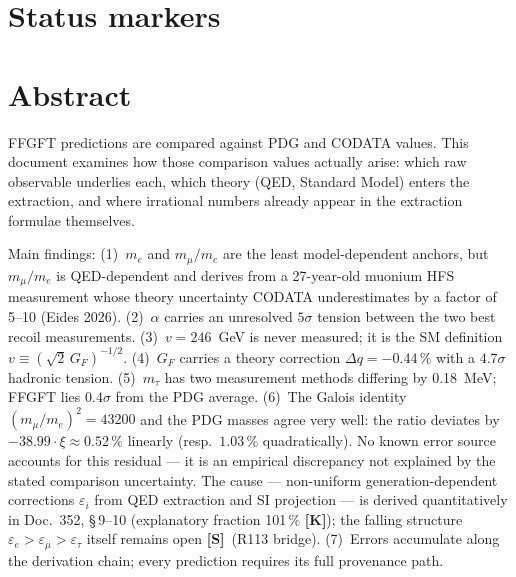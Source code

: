 \providecommand{\BM}{\textbf{[B]}}
\providecommand{\KM}{\textbf{[K]}}
\providecommand{\SM}{\textbf{[S]}}
\providecommand{\QM}{\textbf{[Q]}}

{}

\section*{Status markers}


\section*{Abstract}

FFGFT predictions are compared against PDG and CODATA values. This document examines how those comparison values actually arise: which raw observable underlies each, which theory (QED, Standard Model) enters the extraction, and where irrational numbers already appear in the extraction formulae themselves.

Main findings: (1)~$m_e$ and $m_\mu/m_e$ are the least model-dependent anchors, but $m_\mu/m_e$ is QED-dependent and derives from a 27-year-old muonium HFS measurement whose theory uncertainty CODATA underestimates by a factor of 5--10 (Eides 2026). (2)~$\alpha$ carries an unresolved $5\sigma$ tension between the two best recoil measurements. (3)~$v=246$~GeV is never measured; it is the SM definition $v\equiv(\sqrt2\,G_F)^{-1/2}$. (4)~$G_F$ carries a theory correction $\Delta q=-0.44\,\%$ with a $4.7\sigma$ hadronic tension. (5)~$m_\tau$ has two measurement methods differing by 0.18~MeV; FFGFT lies $0.4\sigma$ from the PDG average. (6)~The Galois identity $(m_\mu/m_e)^2=43200$ and the PDG masses agree very well: the ratio deviates by $-38.99\cdot\xi\approx0.52\,\%$ linearly (resp.\ $1.03\,\%$ quadratically). No known error source accounts for this residual --- it is an empirical discrepancy not explained by the stated comparison uncertainty. The cause --- non-uniform generation-dependent corrections $\varepsilon_i$ from QED extraction and SI projection --- is derived quantitatively in Doc.~352, §\,9--10 (explanatory fraction 101\,\% \KM); the falling structure $\varepsilon_e > \varepsilon_\mu > \varepsilon_\tau$ itself remains open \SM\ (R113 bridge). (7)~Errors accumulate along the derivation chain; every prediction requires its full provenance path.

